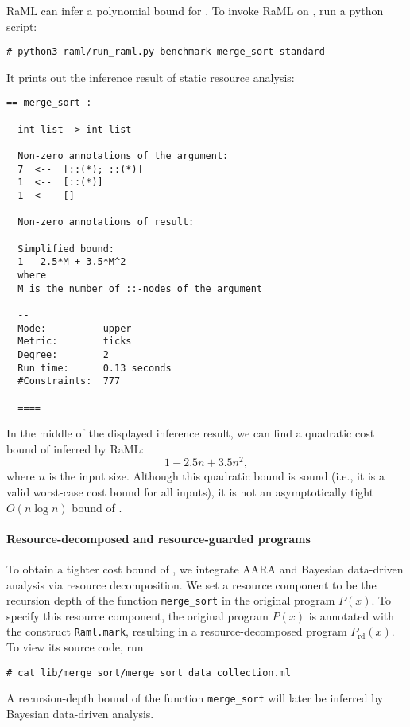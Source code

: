 RaML can infer a polynomial bound for \mergesort{}.
%
To invoke RaML on \mergesort{}, run a python script:
\begin{verbatim}
# python3 raml/run_raml.py benchmark merge_sort standard
\end{verbatim}
%
It prints out the inference result of static resource analysis:
\begin{Verbatim}[fontsize=\footnotesize]
  == merge_sort :

  int list -> int list

  Non-zero annotations of the argument:
  7  <--  [::(*); ::(*)]
  1  <--  [::(*)]
  1  <--  []

  Non-zero annotations of result:

  Simplified bound:
  1 - 2.5*M + 3.5*M^2
  where
  M is the number of ::-nodes of the argument

  --
  Mode:          upper
  Metric:        ticks
  Degree:        2
  Run time:      0.13 seconds
  #Constraints:  777

  ====
\end{Verbatim}
%
In the middle of the displayed inference result, we can find a quadratic cost
bound of \mergesort{} inferred by RaML:
\begin{equation}
  1 - 2.5 n + 3.5 n^2,
\end{equation}
where $n$ is the input size.
%
Although this quadratic bound is sound (i.e., it is a valid worst-case cost
bound for all inputs), it is not an asymptotically tight $O(n \log n)$ bound of
\mergesort{}.

\paragraph{Resource-decomposed and resource-guarded programs}

To obtain a tighter cost bound of \mergesort{}, we integrate AARA and Bayesian
data-driven analysis via resource decomposition.
%
We set a resource component to be the recursion depth of the function
\texttt{merge\_sort} in the original program $P(x)$.
%
To specify this resource component, the original program $P(x)$ is annotated
with the construct \texttt{Raml.mark}, resulting in a resource-decomposed
program $P_{\mathrm{rd}}(x)$.
%
To view its source code, run
\begin{verbatim}
# cat lib/merge_sort/merge_sort_data_collection.ml
\end{verbatim}
%
A recursion-depth bound of the function \texttt{merge\_sort} will later be
inferred by Bayesian data-driven analysis.

